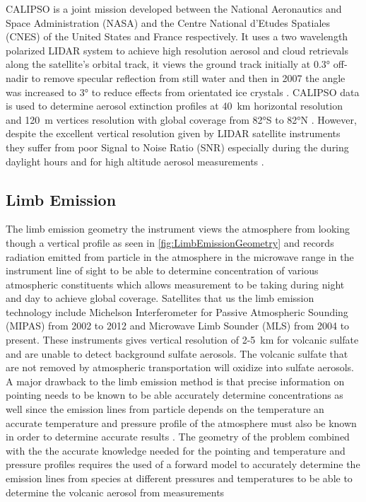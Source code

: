 CALIPSO is a joint mission developed between the National Aeronautics and Space Administration (NASA) and the Centre National d'Etudes Spatiales (CNES) of the United States and France respectively. It uses a two wavelength polarized LIDAR system to achieve high resolution aerosol and cloud retrievals along the satellite's orbital track, it views the ground track initially at 0.3\si{\degree} off-nadir to remove specular reflection from still water and then in 2007 the angle was increased to 3\si{\degree} to reduce effects from orientated ice crystals \citep{Hu2009}. CALIPSO data is used to determine aerosol extinction profiles at 40~km horizontal resolution and 120~m vertices resolution with global coverage from 82\si{\degree}S to 82\si{\degree}N \citep{Young2009}. However, despite the excellent vertical resolution given by LIDAR satellite instruments they suffer from poor Signal to Noise Ratio (SNR) especially during the during daylight hours and for high altitude aerosol measurements \citep{Kacenelenbogen2011}.

\subsection{Limb Emission}

The limb emission geometry the instrument views the atmosphere from looking though a vertical profile as seen in \autoref{fig:LimbEmissionGeometry} and records radiation emitted from particle in the atmosphere in the microwave range in the instrument line of sight to be able to determine concentration of various atmospheric constituents which allows measurement to be taking during night and day to achieve global coverage. Satellites that us the limb emission technology include Michelson Interferometer for Passive Atmospheric Sounding (MIPAS) \citep{Fischer2008} from 2002 to 2012 and Microwave Limb Sounder (MLS) \citep{Waters2006} from 2004 to present. These instruments gives vertical resolution of 2-5~km for volcanic sulfate \citep{Thomas2010} and are unable to detect background sulfate aerosols. The volcanic sulfate that are not removed by atmospheric transportation will oxidize into sulfate aerosols. A major drawback to the limb emission method is that precise information on pointing needs to be known to be able accurately determine concentrations as well since the emission lines from particle depends on the temperature an accurate temperature and pressure profile of the atmosphere must also be known in order to determine accurate results \citep{Von2003}. The geometry of the problem combined with the the accurate knowledge needed for the pointing and temperature and pressure profiles requires the used of a forward model to accurately determine the emission lines from species at different pressures and temperatures to be able to determine the volcanic aerosol from measurements \citep{Livesey2006}

